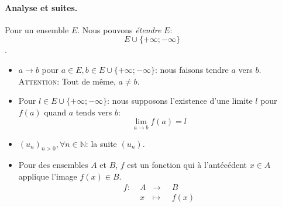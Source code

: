 \documentclass{article}
\newcommand{\setf}[1]{\{#1 \}}
\begin{document}
\paragraph{Analyse et suites.}
Pour un ensemble $E$.
Nous pouvons \textit{étendre} $E$: $$
    E \cup \setf{+\infty; -\infty}
$$.

\begin{itemize}
    \item $a \to b$ pour $a \in E, b \in E \cup \setf{+\infty; -\infty}$: 
        nous faisons tendre $a$ vers $b$. \\
        \textsc{Attention}: Tout de même, $a \neq b$.
    \item Pour $l \in E \cup \setf{+\infty; -\infty}$: 
        nous supposons l'existence d'une limite $l$ pour $f(a)$ quand $a$ tends vers $b$: 
        $$
            \lim_{a \to b}{f(a)} = l
        $$

    \item $(u_n)_{n > 0}, \forall n \in \mathbb{N}$: la suite $(u_n)$.
    \item Pour des ensembles $A$ et $B$, $f$ est un fonction qui à l'antécédent $x \in A$ 
        applique l'image $f(x) \in B$.
        $$
        \begin{aligned}
            f:\;&A &\to     \;\; &B \\
                &x &\mapsto \;\; &f(x)
        \end{aligned}  
        $$ 

    \end{itemize}
\end{document}
